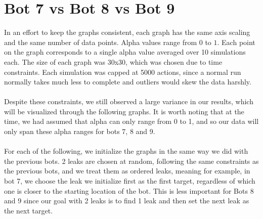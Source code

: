 \documentclass[12pt]{article}
\begin{document}
 

\section*{Bot 7 vs Bot 8 vs Bot 9}
In an effort to keep the graphs consistent, each graph has the same axis scaling
and the same number of data points. Alpha values range from $0$ to $1$. Each point 
on the graph corresponds to a single alpha value averaged over 10 simulations each. The size 
of each graph was 30x30, which was chosen due to time constraints. Each simulation was capped at 5000
actions, since a normal run normally takes much less to complete and outliers would skew the data harshly.
\\
\\
Despite these constraints, we still observed a large variance in our results, which will be visualized 
through the following graphs. It is worth noting that at the time, we had assumed that 
alpha can only range from 0 to 1, and so our data will only span these alpha ranges for bots 7, 8 and 9. 
\\
\\
For each of the following, we initialize the graphs in the same way we did with the previous bots. 2 leaks are chosen 
at random, following the same constraints as the previous bots, and we treat them as ordered leaks, meaning for example, in 
bot 7, we choose the leak we initialize first as the first target, regardless of which one is closer to the 
starting location of the bot. This is less important for Bots 8 and 9 since our goal with 2 leaks is to find 1 leak and 
then set the next leak as the next target.
\end{document}
